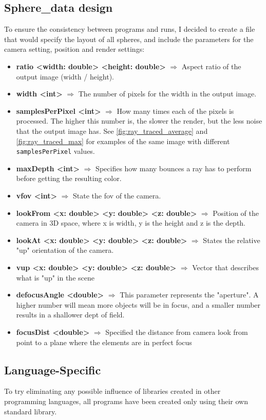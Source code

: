 \subsection{Sphere\_data design}

To ensure the consistency between programs and runs, I decided to create a file that would specify the layout of all spheres, and include the parameters for the camera setting, position and render settings:
\begin{itemize}
    \item \textbf{ratio <width: double> <height: double>} $\Rightarrow{}$ Aspect ratio of the output image (width / height).
    \item \textbf{width <int>} $\Rightarrow{}$ The number of pixels for the width in the output image.
    \item \textbf{samplesPerPixel <int>} $\Rightarrow{}$ How many times each of the pixels is processed. The higher this number is, the slower the render, but the less noise that the output image has. See \autoref{fig:ray_traced_average} and \autoref{fig:ray_traced_max} for examples of the same image with different \texttt{samplesPerPixel} values.
    \item \textbf{maxDepth <int>} $\Rightarrow{}$ Specifies how many bounces a ray has to perform before getting the resulting color.
    \item \textbf{vfov <int>} $\Rightarrow{}$ State the \gls{fov} of the camera.
    \item \textbf{lookFrom <x: double> <y: double> <z: double>} $\Rightarrow{}$ Position of the camera in 3D space, where x is width, y is the height and z is the depth.
    \item \textbf{lookAt <x: double> <y: double> <z: double>} $\Rightarrow{}$ States the relative "up" orientation of the camera.
    \item \textbf{vup <x: double> <y: double> <z: double>} $\Rightarrow{}$ Vector that describes what is "up" in the scene
    \item \textbf{defocusAngle <double>} $\Rightarrow{}$ This parameter represents the "aperture". A higher number will mean more objects will be in focus, and a smaller number results in a shallower dept of field.
    \item \textbf{focusDist <double>} $\Rightarrow{}$ Specified the distance from camera look from point to a plane where the elements are in perfect focus
\end{itemize}

\subsection{Language-Specific}
To try eliminating any possible influence of libraries created in other programming languages, all programs have been created only using their own standard library.

